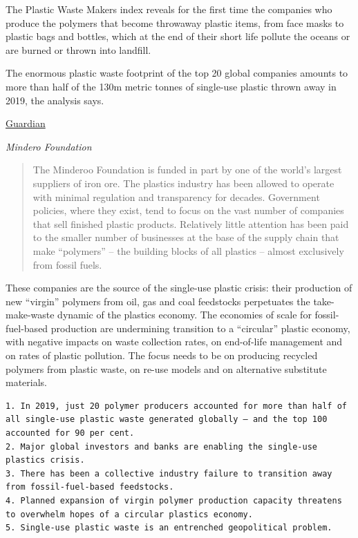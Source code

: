 \documentclass[
]{book}
\begin{document}
The Plastic Waste Makers index reveals for the first time the companies who produce the polymers that become throwaway plastic items, from face masks to plastic bags and bottles, which at the end of their short life pollute the oceans or are burned or thrown into landfill.

The enormous plastic waste footprint of the top 20 global companies amounts to more than half of the 130m metric tonnes of single-use plastic thrown away in 2019, the analysis says.

\href{https://www.theguardian.com/environment/2021/may/18/twenty-firms-produce-55-of-worlds-plastic-waste-report-reveals}{Guardian}

\emph{Mindero Foundation}

\begin{quote}
The Minderoo Foundation is funded in part by one of the world's largest suppliers of iron ore.
The plastics industry has been allowed to operate with minimal regulation and transparency for decades. Government policies, where they exist, tend to focus on the vast number of companies that sell finished plastic products. Relatively little attention has been paid to the smaller number of businesses at the base of the supply chain that make ``polymers'' -- the building blocks of all plastics -- almost exclusively from fossil fuels.
\end{quote}

These companies are the source of the single-use plastic crisis: their production of new ``virgin'' polymers from oil, gas and coal feedstocks perpetuates the take-make-waste dynamic of the plastics economy. The economies of scale for fossil-fuel-based production are undermining transition to a ``circular'' plastic economy, with negative impacts on waste collection rates, on end-of-life management and on rates of plastic pollution. The focus needs to be on producing recycled polymers from plastic waste, on re-use models and on alternative substitute materials.

\begin{verbatim}
1. In 2019, just 20 polymer producers accounted for more than half of all single-use plastic waste generated globally – and the top 100 accounted for 90 per cent.  
2. Major global investors and banks are enabling the single-use plastics crisis.  
3. There has been a collective industry failure to transition away from fossil-fuel-based feedstocks.  
4. Planned expansion of virgin polymer production capacity threatens to overwhelm hopes of a circular plastics economy.  
5. Single-use plastic waste is an entrenched geopolitical problem.  
\end{verbatim}
\end{document}
